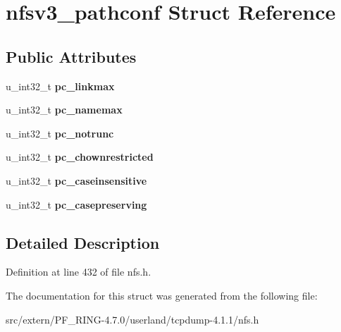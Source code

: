 \hypertarget{structnfsv3__pathconf}{
\section{nfsv3\_\-pathconf Struct Reference}
\label{structnfsv3__pathconf}
}
\subsection*{Public Attributes}
\begin{DoxyCompactItemize}
\item 
\hypertarget{structnfsv3__pathconf_aaeb7434a7ea55d975a06310f2c19d3c8}{
u\_\-int32\_\-t {\bfseries pc\_\-linkmax}}
\label{structnfsv3__pathconf_aaeb7434a7ea55d975a06310f2c19d3c8}

\item 
\hypertarget{structnfsv3__pathconf_a26a6d9b60a432a8150d07ec32758b6ef}{
u\_\-int32\_\-t {\bfseries pc\_\-namemax}}
\label{structnfsv3__pathconf_a26a6d9b60a432a8150d07ec32758b6ef}

\item 
\hypertarget{structnfsv3__pathconf_a5a5d4e9fb5420458eb19be1d4bbf5e3d}{
u\_\-int32\_\-t {\bfseries pc\_\-notrunc}}
\label{structnfsv3__pathconf_a5a5d4e9fb5420458eb19be1d4bbf5e3d}

\item 
\hypertarget{structnfsv3__pathconf_a4a31dad2f17d66b8945016f1a1bb6c8d}{
u\_\-int32\_\-t {\bfseries pc\_\-chownrestricted}}
\label{structnfsv3__pathconf_a4a31dad2f17d66b8945016f1a1bb6c8d}

\item 
\hypertarget{structnfsv3__pathconf_af1de74f56e157f55af767d7093337faf}{
u\_\-int32\_\-t {\bfseries pc\_\-caseinsensitive}}
\label{structnfsv3__pathconf_af1de74f56e157f55af767d7093337faf}

\item 
\hypertarget{structnfsv3__pathconf_a0f46aa648d9d1726fad44f1e74539c62}{
u\_\-int32\_\-t {\bfseries pc\_\-casepreserving}}
\label{structnfsv3__pathconf_a0f46aa648d9d1726fad44f1e74539c62}

\end{DoxyCompactItemize}


\subsection{Detailed Description}


Definition at line 432 of file nfs.h.



The documentation for this struct was generated from the following file:\begin{DoxyCompactItemize}
\item 
src/extern/PF\_\-RING-\/4.7.0/userland/tcpdump-\/4.1.1/nfs.h\end{DoxyCompactItemize}
